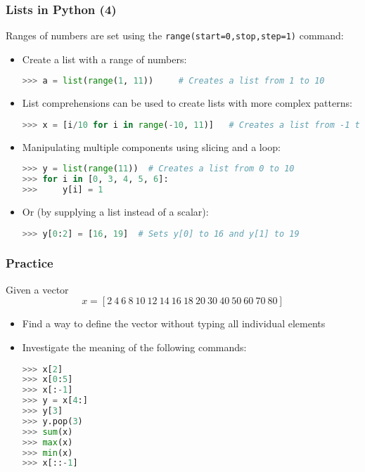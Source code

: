  \begin{frame}[fragile]
   \frametitle{Lists in Python (4)}
   Ranges of numbers are set using the \lstinline|range(start=0,stop,step=1)| command:
   \begin{itemize}
    \item Create a list with a range of numbers:
    \begin{lstlisting}[language=Python,numbers=none]
>>> a = list(range(1, 11))     # Creates a list from 1 to 10
    \end{lstlisting}\pause
    \item List comprehensions can be used to create lists with more complex patterns:
    \begin{lstlisting}[language=Python,numbers=none]
>>> x = [i/10 for i in range(-10, 11)]   # Creates a list from -1 to 1 with a step of 0.1
    \end{lstlisting}\pause
    \item Manipulating multiple components using slicing and a loop:
    \begin{lstlisting}[language=Python,numbers=none]
>>> y = list(range(11))  # Creates a list from 0 to 10
>>> for i in [0, 3, 4, 5, 6]: 
>>>     y[i] = 1
    \end{lstlisting}\pause
    \item Or (by supplying a list instead of a scalar):
    \begin{lstlisting}[language=Python,numbers=none]
>>> y[0:2] = [16, 19]  # Sets y[0] to 16 and y[1] to 19
    \end{lstlisting}
  \end{itemize}
 \end{frame}
 

\begin{frame}[fragile]
 \frametitle{Practice}
 Given a vector 
 \[ 
    x = \left[2 \ 4 \ 6 \ 8 \ 10 \ 12 \ 14 \ 16 \ 18 \ 20 \ 30 \ 40 \ 50 \ 60 \ 70 \ 80 \right]
 \]
 \begin{itemize}
  \item Find a way to define the vector without typing all individual elements\pause
  \item Investigate the meaning of the following commands:
  \begin{lstlisting}[language=Python, numbers=none]
>>> x[2]            
>>> x[0:5]          
>>> x[:-1]          
>>> y = x[4:]       
>>> y[3]            
>>> y.pop(3)      
>>> sum(x)    
>>> max(x)       
>>> min(x) 
>>> x[::-1]       
    \end{lstlisting}    
 \end{itemize}
\end{frame}

